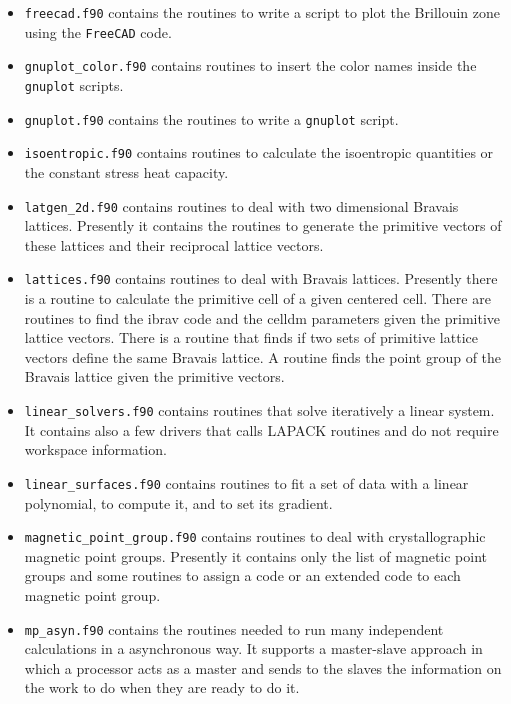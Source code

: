 \documentclass[12pt,a4paper]{article}
\begin{document}
\begin{itemize}
\item
\texttt{freecad.f90} contains the routines to write a script to plot the
Brillouin zone using the \texttt{FreeCAD} code.

\item
\texttt{gnuplot\_color.f90} contains routines to insert the color names
inside the \texttt{gnuplot} scripts.

\item
\texttt{gnuplot.f90} contains the routines to write a \texttt{gnuplot} script.

\item
\texttt{isoentropic.f90} contains routines to calculate the isoentropic
quantities or the constant stress heat capacity.

\item
\texttt{latgen\_2d.f90} contains routines to deal with two dimensional
Bravais lattices. Presently it contains the routines to generate the
primitive vectors of these lattices and their reciprocal lattice vectors.

\item \texttt{lattices.f90} contains routines to deal with Bravais lattices.
Presently there is a routine to calculate the primitive cell of
a given centered cell. There are routines to find the ibrav code and the
celldm parameters given the primitive lattice vectors. There is a routine
that finds if two sets of primitive lattice vectors define the same 
Bravais lattice. A routine finds the point group of the Bravais lattice
given the primitive vectors.

\item
\texttt{linear\_solvers.f90} contains routines that solve iteratively
a linear system. It contains also a few drivers that calls LAPACK routines
and do not require workspace information. 

\item
\texttt{linear\_surfaces.f90} contains routines to fit a set of data
with a linear polynomial, to compute it, and to set its gradient.  

\item
\texttt{magnetic\_point\_group.f90} contains routines to deal with 
crystallographic
magnetic point groups. Presently it contains only the list of magnetic
point groups and some routines to assign a code or an extended code to each
magnetic point group.

\item
\texttt{mp\_asyn.f90} contains the routines needed to run many 
independent calculations in a asynchronous way. It supports a master-slave
approach in which a processor acts as a master and sends to the slaves
the information on the work to do when they are ready to do it.


\end{itemize}
\end{document}
